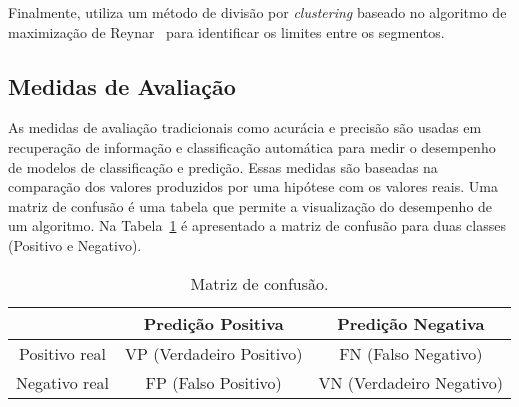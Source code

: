 Finalmente, utiliza um método de divisão por \textit{clustering} baseado no algoritmo de maximização de Reynar~\cite{Reynar1998} para identificar os limites entre os segmentos. 

\subsection{Medidas de Avaliação}

%
As medidas de avaliação tradicionais como acurácia e precisão são usadas em recuperação de informação e classificação automática para medir o desempenho de modelos de classificação e predição.
%
Essas medidas são baseadas na comparação dos valores produzidos por uma hipótese com os valores reais. Uma matriz de confusão é uma tabela que permite a visualização do desempenho de um algoritmo. Na Tabela~\ref{tab:matrizconfusao} é apresentado a matriz de confusão para duas classes (Positivo e Negativo).


\begin{table}[!h]
	\centering
	
	\begin{tabular}{|c|c|c|}
		\hline
		                & Predição Positiva         & Predição Negativa        \\ \hline
		Positivo real   & VP (Verdadeiro Positivo)  & FN (Falso Negativo)      \\ \hline
		Negativo real   & FP (Falso Positivo)       & VN (Verdadeiro Negativo) \\ \hline
	
	\end{tabular}
	
	\caption{Matriz de confusão.}
	\label{tab:matrizconfusao}

\end{table}



